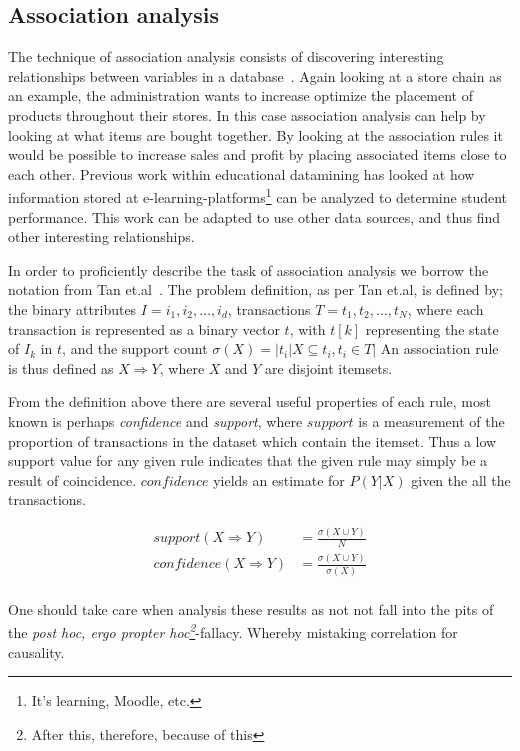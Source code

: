 \subsection{Association analysis}
	The technique of association analysis consists of discovering interesting relationships between variables
	in a database~\cite{Piateski:1991:assocrules,tan:2006:datamining,Agrawal:1993:assocrules}.
	Again looking at a store chain as an example, the administration wants to increase optimize the placement of products throughout their stores. 
	In this case association analysis can help by looking at what items are bought together. 
	By looking at the association rules it would be possible to increase sales and profit by placing associated items close to each other.
	Previous work within educational datamining has looked at how information stored at e-learning-platforms\footnote{It's learning, Moodle, etc.}
	can be analyzed to determine student performance\cite{merceron2008interestingness}. 
	This work can be adapted to use other data sources, and thus find other interesting relationships.  
		
	\bigskip\noindent
	In order to proficiently describe the task of association analysis we borrow the notation from Tan et.al~\cite{tan:2006:datamining}.
	The problem definition, as per Tan et.al, is defined by; 
	the binary attributes $I = i_1, i_2, \ldots, i_d$, 
	transactions $T = t_1, t_2,\ldots, t_N$, where each transaction	is represented as a binary vector $t$, with $t[k]$ representing the state of $I_k$ in $t$, and the support count $\sigma (X) = |{t_i|X\subseteq t_i, t_i \in T}|$
	An association rule is thus defined as $X \Rightarrow Y$, where $X$ and $Y$ are disjoint itemsets.
	
	\bigskip\noindent
	From the definition above there are several useful properties of each rule, most known is perhaps \textit{confidence} and \textit{support},
	where $support$ is a measurement of the proportion of transactions in the dataset which contain the itemset. Thus a low support value for any given rule indicates that the given rule may simply be a result of coincidence. $confidence$ yields an estimate for $P(Y|X)$ given the all the transactions.
	\begin{figure}[H]
		\begin{align}
			support(X\Rightarrow Y) &= \frac{\sigma (X \cup Y)}{N}\nonumber\\
			confidence(X\Rightarrow Y) &= \frac{\sigma (X \cup Y)}{\sigma (X)}\nonumber\\
		\end{align}
	\end{figure}
	
	\bigskip\noindent
	One should take care when analysis these results as not not fall into the pits of the \textit{post hoc, ergo propter hoc\footnote{After this, therefore, because of this}}-fallacy\cite{posthoc}. Whereby mistaking correlation for causality.
	
	